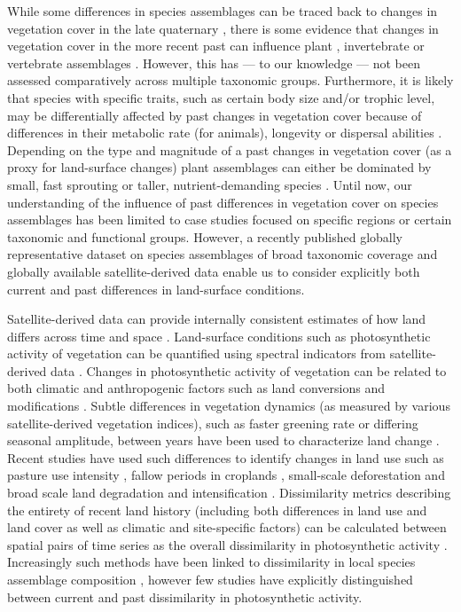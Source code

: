 While some differences in species assemblages can be traced back to changes in vegetation cover in the late quaternary \citep{Vegas-Vilarrubia2011,McMichael2017}, there is some evidence that changes in vegetation cover in the more recent past can influence plant \citep{Jakovac2016}, invertebrate \citep{Valtonen2013} or vertebrate assemblages \citep{Newton2014, Cole2015, Graham2015}. However, this has — to our knowledge — not been assessed comparatively across multiple taxonomic groups. Furthermore, it is likely that species with specific traits, such as certain body size and/or trophic level, may be differentially affected by past changes in vegetation cover because of differences in their metabolic rate (for animals), longevity or dispersal abilities \citep{Sutherland2000, Brown2004, Speakman2005,Thomson2011,DePalma2015}. Depending on the type and magnitude of a past changes in vegetation cover (as a proxy for land-surface changes) plant assemblages can either be dominated by small, fast sprouting or taller, nutrient-demanding species \citep{Jakovac2016,Perring2018}. Until now, our understanding of the influence of past differences in vegetation cover on species assemblages has been limited to case studies focused on specific regions or certain taxonomic and functional groups. However, a recently published globally representative dataset on species assemblages of broad taxonomic coverage \citep{Hudson2016} and globally available satellite-derived data enable us to consider explicitly both current and past differences in land-surface conditions.

Satellite-derived data can provide internally consistent estimates of how land differs across time and space \citep{Pettorelli2005, Kennedy2014}. Land-surface conditions such as photosynthetic activity of vegetation can be quantified using spectral indicators from satellite-derived data \citep{Gamon1995, Zhang2006}. Changes in photosynthetic activity of vegetation can be related to both climatic \citep{Fensholt2012, Zhu2016} and anthropogenic factors such as land conversions and modifications \citep{Lambin2003, Muller2014}. Subtle differences in vegetation dynamics (as measured by various satellite-derived vegetation indices), such as faster greening rate or differing seasonal amplitude, between years have been used to characterize land change \citep{Lambin1994, Linderman2005, Lupo2007}. Recent studies have used such differences to identify changes in land use such as pasture use intensity \citep{Rufin2015}, fallow periods in croplands \citep{Estel2015, Tong2017}, small-scale deforestation \citep{DeVries2015b} and broad scale land degradation and intensification \citep{deJong2011,Muller2014}. Dissimilarity metrics describing the entirety of recent land history (\eg including both differences in land use and land cover as well as climatic and site-specific factors) can be calculated between spatial pairs of time series as the overall dissimilarity in photosynthetic activity \citep{Linderman2005, Lhermitte2011}. Increasingly such methods have been linked to dissimilarity in local species assemblage composition \citep{Rowhani2008, Goetz2014, Nieto2015, Hobi2017}, however few studies have explicitly distinguished between current and past dissimilarity in photosynthetic activity.
	
